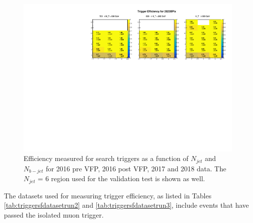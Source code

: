 \documentclass[twoside]{article}
\begin{document}
\begin{figure}[!t]
    \includegraphics[width=.8\columnwidth]{plots/Trigger/2023BPix.pdf}
    
    \caption{Efficiency measured for search triggers as a function of $N_{jet}$ and $N_{b-jet}$ for 2016 pre VFP, 2016 post VFP, 2017 and 2018 data. The $N_{jet}$ = 6 region used for the validation test is shown as well.}
\end{figure}
The datasets used for measuring trigger efficiency, as listed in Tables \ref{tab:triggersfdatasetrun2} and \ref{tab:triggersfdatasetrun3}, include events that have passed the isolated muon trigger.
\end{document}
